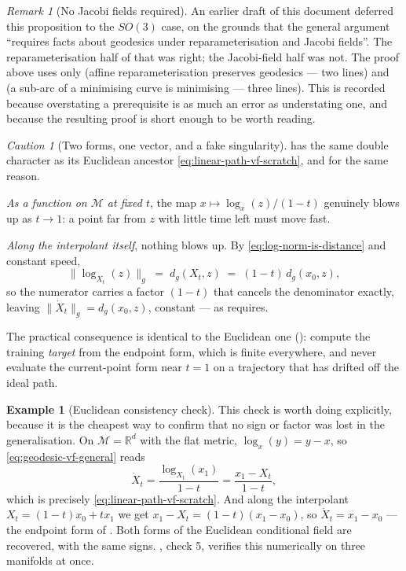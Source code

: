 \documentclass[11pt,a4paper]{report}
\theoremstyle{definition}
\newtheorem{example}[example]{Example}
\theoremstyle{remark}
\newtheorem{remark}[remark]{Remark}
\newtheorem{caution}[caution]{Caution}
\newcommand{\RR}{\mathbb R}
\begin{document}
\begin{remark}[No Jacobi fields required]
\label{rem:no-jacobi}
An earlier draft of this document deferred this proposition to the $SO(3)$
case, on the grounds that the general argument ``requires facts about
geodesics under reparameterisation and Jacobi fields''. The reparameterisation
half of that was right; the Jacobi-field half was not. The proof above uses
only  (affine reparameterisation preserves
geodesics --- two lines) and  (a sub-arc of a
minimising curve is minimising --- three lines). This is recorded because
overstating a prerequisite is as much an error as understating one, and
because the resulting proof is short enough to be worth reading.
\end{remark}

\begin{caution}[Two forms, one vector, and a fake singularity]
\label{caution:rfm-two-forms}
 has the same double character as its Euclidean
ancestor \eqref{eq:linear-path-vf-scratch}, and for the same reason.

\emph{As a function on $\mathcal M$ at fixed $t$}, the map
$x\mapsto\log_x(z)/(1-t)$ genuinely blows up as $t\to1$: a point far from
$z$ with little time left must move fast.

\emph{Along the interpolant itself}, nothing blows up. By
\eqref{eq:log-norm-is-distance} and constant speed,
\[
\bigl\|\log_{X_t}(z)\bigr\|_g \;=\; d_g(X_t,z) \;=\; (1-t)\,d_g(x_0,z) ,
\]
so the numerator carries a factor $(1-t)$ that cancels the denominator
exactly, leaving $\|\dot X_t\|_g=d_g(x_0,z)$, constant --- as
 requires.

The practical consequence is identical to the Euclidean one
(): compute the training \emph{target} from
the endpoint form, which is finite everywhere, and never evaluate the
current-point form near $t=1$ on a trajectory that has drifted off the ideal
path.
\end{caution}

\begin{example}[Euclidean consistency check]
\label{ex:rfm-euclidean-check}
This check is worth doing explicitly, because it is the cheapest way to
confirm that no sign or factor was lost in the generalisation. On
$\mathcal M=\RR^d$ with the flat metric, $\log_x(y)=y-x$, so
\eqref{eq:geodesic-vf-general} reads
\[
\dot X_t = \frac{\log_{X_t}(x_1)}{1-t} = \frac{x_1-X_t}{1-t} ,
\]
which is precisely \eqref{eq:linear-path-vf-scratch}. And along the
interpolant $X_t=(1-t)x_0+tx_1$ we get $x_1-X_t=(1-t)(x_1-x_0)$, so
$\dot X_t=x_1-x_0$ --- the endpoint form of .
Both forms of the Euclidean conditional field are recovered, with the same
signs. , check 5, verifies this numerically on three
manifolds at once.
\end{example}
\end{document}
